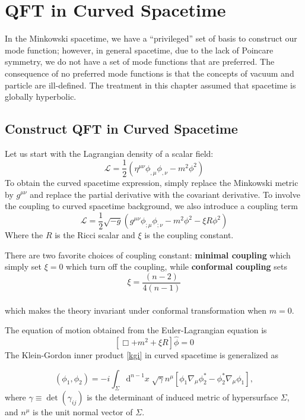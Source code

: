 \documentclass[12pt]{article}
\numberwithin{equation}{subsection}
\theoremstyle{mystyle}{\newtheorem{definition}{Definition}[subsection]}
\theoremstyle{mystyle}{\newtheorem{theorem}[definition]{Theorem}}
\theoremstyle{mystyle}{\newtheorem*{remark}{Remark}}
\theoremstyle{mystyle}{\newtheorem{example}{Example}[subsection]}
\theoremstyle{mystyle}{\newtheorem{examples}{Examples}[subsection]}
\theoremstyle{mystyle}{\newtheorem{cthm}{}[subsection]}
\newcommand{\id}{\mathrm{d}}
\begin{document}
\newpage

\section{QFT in Curved Spacetime}
In the Minkowski spacetime, we have a ``privileged'' set of basis to construct our mode function; however, in general spacetime,
due to the lack of Poincare symmetry, we do not have a set of mode functions that are preferred.
The consequence of no preferred mode functions is that the concepts of vacuum and particle are ill-defined.
The treatment in this chapter assumed that spacetime is globally hyperbolic.



\subsection{Construct QFT in Curved Spacetime}
Let us start with the Lagrangian density of a scalar field:
\[\mathcal{L} = \frac{1}{2}(\eta^{\mu\nu} \phi_{,\mu} \phi_{,\nu}- m^2 \phi^2)\]
To obtain the curved spacetime expression,
simply replace the Minkowski metric by \(g^{\mu\nu}\) and replace the partial derivative with the covariant derivative.
To involve the coupling to curved spacetime background, we also introduce a coupling term
\begin{equation}
  \mathcal{L} = \frac{1}{2}\sqrt{-g}(g^{\mu\nu} \phi_{;\mu} \phi_{;\nu}- m^2 \phi^2-\xi R \phi^2)
\end{equation}
Where the \(R\) is the Ricci scalar and \(\xi\) is the coupling constant.\par
There are two favorite choices of coupling constant:
\textbf{minimal coupling} which simply set \(\xi=0\) which turn off the coupling,
while \textbf{conformal coupling} sets \[\xi = \frac{(n-2)}{4(n-1)}\]\\
which makes the theory invariant under conformal transformation when \(m=0\).


The equation of motion obtained from the Euler-Lagrangian equation is
\begin{equation}
  \left[\Box+m^2+\xi R\right]\hat{\phi}=0
\end{equation}
The Klein-Gordon inner product \ref{kgi} in curved spacetime is generalized as
\begin{definition}
  \[(\phi_1,\phi_2)=-i\int_{\Sigma}\id^{n-1}x\;\sqrt{\gamma}n^{\mu}\left[\phi_1\nabla_\mu\phi^*_2-\phi_2^*\nabla_\mu\phi_1\right],\]
  where \(\gamma\equiv \det(\gamma_{ij})\) is the determinant of induced metric of hypersurface \(\Sigma\),
  and \(n^{\mu}\) is the unit normal vector of \(\Sigma\).
\end{definition}
\end{document}
